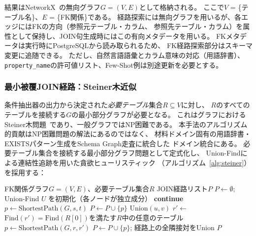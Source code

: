 \documentclass[5p,twocolumn]{elsarticle}
\begin{document}
結果はNetworkX~\citep{networkx2008}の無向グラフ$G = (V, E)$として格納される。
ここで$V$ = \{テーブル名\}、$E$ = \{FK関係\}である。
経路探索には無向グラフを用いるが、各エッジにはFKの方向（参照元テーブル・カラム、
参照先テーブル・カラム）を属性として保持し、JOIN句生成時にはこの有向メタデータを用いる。
FKメタデータは実行時にPostgreSQLから読み取られるため、
FK経路探索部分はスキーマ変更に追随できる。
ただし、自然言語語彙とカラム意味の対応（用語辞書）、
\texttt{property\_name}の許可値リスト、Few-Shot例は別途更新を必要とする。

\subsubsection{最小被覆JOIN経路：Steiner木近似}
\label{sec:steiner}

条件抽出器の出力から決定された\textit{必要テーブル}集合$R \subseteq V$に対し、
$R$のすべてのテーブルを接続する$G$の最小部分グラフが必要となる。
これはグラフにおけるSteiner木問題~\citep{hwang1992steiner}であり、一般グラフではNP困難である。
本手法のアルゴリズム的貢献はNP困難問題の解法にあるのではなく、
材料ドメイン固有の用語辞書・EXISTSパターン生成をSchema Graph走査に統合した
ドメイン統合にある。
必要テーブル集合を接続する最小部分グラフ問題として定式化し、
Union-Findによる連結性追跡を用いた貪欲ヒューリスティック
（アルゴリズム~\ref{alg:steiner}）を採用する：

\begin{algorithm}[htbp]
  \caption{最小被覆JOIN部分グラフ（Steiner木近似）。}
  \label{alg:steiner}
  \begin{algorithmic}[1]
    \Require FK関係グラフ$G = (V, E)$、必要テーブル集合$R$
    \Ensure JOIN経路リスト$P$
    \State $P \gets \emptyset$; Union-Find $U$ を初期化（各ノードが独立成分）
        \State \textbf{continue} 
      \EndIf
      \State $p \gets \text{ShortestPath}(G, s, t)$ 
        \State $P \gets P \cup \{p\}$
          \State $\text{Union}(u, v)$
        \EndFor
      \EndIf
    \EndFor
     
      \State $r' \gets $ $\text{Find}(r') = \text{Find}(R[0])$を満たす$R$中の任意のテーブル
      \State $p \gets \text{ShortestPath}(G, r, r')$
        \State $P \gets P \cup \{p\}$; 経路上の全隣接対を$\text{Union}$
      \EndIf
    \EndFor
    \State \Return $P$
  \end{algorithmic}
\end{algorithm}
\end{document}
